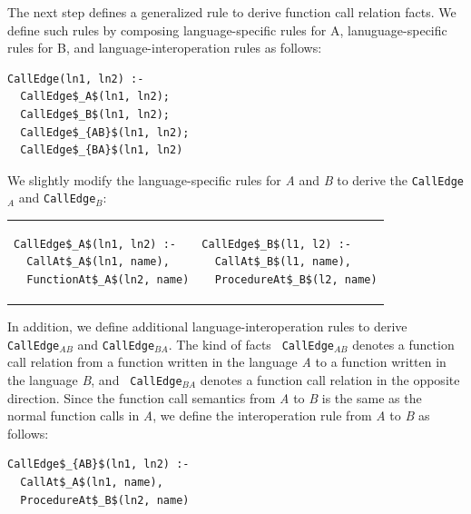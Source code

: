 The next step defines a generalized rule to derive function call relation
facts. We define such rules by composing language-specific rules for A,
lanuguage-specific rules for B, and language-interoperation rules as follows:

\begin{lstlisting}
CallEdge(ln1, ln2) :-
  CallEdge$_A$(ln1, ln2);
  CallEdge$_B$(ln1, ln2);
  CallEdge$_{AB}$(ln1, ln2);
  CallEdge$_{BA}$(ln1, ln2)
\end{lstlisting}


\noindent 
We slightly modify the language-specific rules for {\it A} and {\it B} to
derive the {\tt CallEdge$_A$} and {\tt CallEdge$_B$}:

\begin{tabular}{ll}
  {\begin{lstlisting}
CallEdge$_A$(ln1, ln2) :-
  CallAt$_A$(ln1, name),
  FunctionAt$_A$(ln2, name)
  \end{lstlisting}} & 
  {\begin{lstlisting}
CallEdge$_B$(l1, l2) :-
  CallAt$_B$(l1, name),
  ProcedureAt$_B$(l2, name)
  \end{lstlisting}}
\end{tabular}

\noindent
In addition, we define additional language-interoperation rules to derive {\tt
CallEdge$_{AB}$} and {\tt CallEdge$_{BA}$}. The kind of facts {\tt
CallEdge$_{AB}$} denotes a function call relation from a function written in
the language {\it A} to a function written in the language {\it B}, and {\tt
CallEdge$_{BA}$} denotes a function call relation in the opposite direction.
Since the function call semantics from {\it A} to {\it B} is the same as the
normal function calls in {\it A}, we define the interoperation rule from {\it
A} to {\it B} as follows: 


\begin{lstlisting}
CallEdge$_{AB}$(ln1, ln2) :-
  CallAt$_A$(ln1, name),
  ProcedureAt$_B$(ln2, name)
\end{lstlisting}


